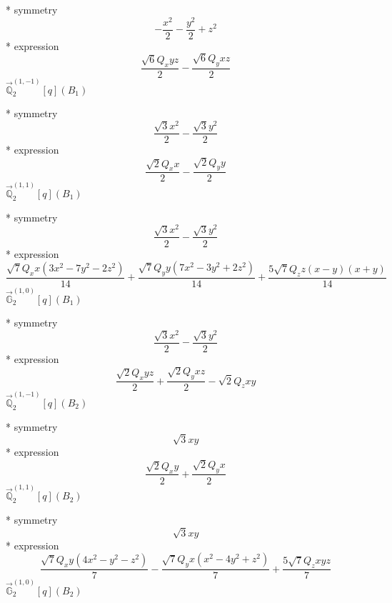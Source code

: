 \documentclass[fleqn,8pt]{jsarticle}
\begin{document}
\noindent\quad ** symmetry
\begin{dmath*}
- \frac{x^{2}}{2} - \frac{y^{2}}{2} + z^{2}
\end{dmath*}
\noindent\quad ** expression
\begin{dmath*}
\frac{\sqrt{6} Q_{x} y z}{2} - \frac{\sqrt{6} Q_{y} x z}{2}
\end{dmath*}
\noindent\quad $\vec{\mathbb{Q}}_{2}^{(1,-1)}[q](B_{1})$

\noindent\quad ** symmetry
\begin{dmath*}
\frac{\sqrt{3} x^{2}}{2} - \frac{\sqrt{3} y^{2}}{2}
\end{dmath*}
\noindent\quad ** expression
\begin{dmath*}
\frac{\sqrt{2} Q_{x} x}{2} - \frac{\sqrt{2} Q_{y} y}{2}
\end{dmath*}
\noindent\quad $\vec{\mathbb{Q}}_{2}^{(1,1)}[q](B_{1})$

\noindent\quad ** symmetry
\begin{dmath*}
\frac{\sqrt{3} x^{2}}{2} - \frac{\sqrt{3} y^{2}}{2}
\end{dmath*}
\noindent\quad ** expression
\begin{dmath*}
\frac{\sqrt{7} Q_{x} x \left(3 x^{2} - 7 y^{2} - 2 z^{2}\right)}{14} + \frac{\sqrt{7} Q_{y} y \left(7 x^{2} - 3 y^{2} + 2 z^{2}\right)}{14} + \frac{5 \sqrt{7} Q_{z} z \left(x - y\right) \left(x + y\right)}{14}
\end{dmath*}
\noindent\quad $\vec{\mathbb{G}}_{2}^{(1,0)}[q](B_{1})$

\noindent\quad ** symmetry
\begin{dmath*}
\frac{\sqrt{3} x^{2}}{2} - \frac{\sqrt{3} y^{2}}{2}
\end{dmath*}
\noindent\quad ** expression
\begin{dmath*}
\frac{\sqrt{2} Q_{x} y z}{2} + \frac{\sqrt{2} Q_{y} x z}{2} - \sqrt{2} Q_{z} x y
\end{dmath*}
\noindent\quad $\vec{\mathbb{Q}}_{2}^{(1,-1)}[q](B_{2})$

\noindent\quad ** symmetry
\begin{dmath*}
\sqrt{3} x y
\end{dmath*}
\noindent\quad ** expression
\begin{dmath*}
\frac{\sqrt{2} Q_{x} y}{2} + \frac{\sqrt{2} Q_{y} x}{2}
\end{dmath*}
\noindent\quad $\vec{\mathbb{Q}}_{2}^{(1,1)}[q](B_{2})$

\noindent\quad ** symmetry
\begin{dmath*}
\sqrt{3} x y
\end{dmath*}
\noindent\quad ** expression
\begin{dmath*}
\frac{\sqrt{7} Q_{x} y \left(4 x^{2} - y^{2} - z^{2}\right)}{7} - \frac{\sqrt{7} Q_{y} x \left(x^{2} - 4 y^{2} + z^{2}\right)}{7} + \frac{5 \sqrt{7} Q_{z} x y z}{7}
\end{dmath*}
\noindent\quad $\vec{\mathbb{G}}_{2}^{(1,0)}[q](B_{2})$
\end{document}

